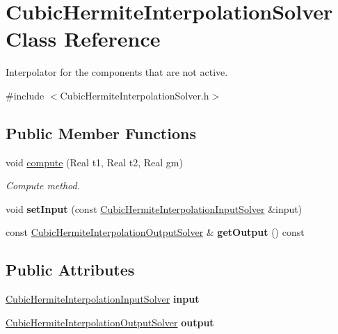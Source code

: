 \hypertarget{classCubicHermiteInterpolationSolver}{
\section{CubicHermiteInterpolationSolver Class Reference}
\label{classCubicHermiteInterpolationSolver}
}


Interpolator for the components that are not active.  


{\ttfamily \#include $<$CubicHermiteInterpolationSolver.h$>$}\subsection*{Public Member Functions}
\begin{DoxyCompactItemize}
\item 
void \hyperlink{classCubicHermiteInterpolationSolver_ac82c752ef418ef7ceb0172f645e01543}{compute} (Real t1, Real t2, Real gm)
\begin{DoxyCompactList}\small\item\em Compute method. \item\end{DoxyCompactList}\item 
\hypertarget{classCubicHermiteInterpolationSolver_a097971cdb4dfeba37b2a17749e2a3d92}{
void {\bfseries setInput} (const \hyperlink{classCubicHermiteInterpolationInputSolver}{CubicHermiteInterpolationInputSolver} \&input)}
\label{classCubicHermiteInterpolationSolver_a097971cdb4dfeba37b2a17749e2a3d92}

\item 
\hypertarget{classCubicHermiteInterpolationSolver_a2631d060d246495ecdfd9d2697e397af}{
const \hyperlink{classCubicHermiteInterpolationOutputSolver}{CubicHermiteInterpolationOutputSolver} \& {\bfseries getOutput} () const }
\label{classCubicHermiteInterpolationSolver_a2631d060d246495ecdfd9d2697e397af}

\end{DoxyCompactItemize}
\subsection*{Public Attributes}
\begin{DoxyCompactItemize}
\item 
\hypertarget{classCubicHermiteInterpolationSolver_ae17c7cdd5d2ae63b2c1b43b5243e36e7}{
\hyperlink{classCubicHermiteInterpolationInputSolver}{CubicHermiteInterpolationInputSolver} {\bfseries input}}
\label{classCubicHermiteInterpolationSolver_ae17c7cdd5d2ae63b2c1b43b5243e36e7}

\item 
\hypertarget{classCubicHermiteInterpolationSolver_a09da14c9cf6fcaccb195f376237b3590}{
\hyperlink{classCubicHermiteInterpolationOutputSolver}{CubicHermiteInterpolationOutputSolver} {\bfseries output}}
\label{classCubicHermiteInterpolationSolver_a09da14c9cf6fcaccb195f376237b3590}

\end{DoxyCompactItemize}


